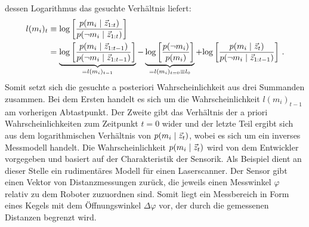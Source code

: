 dessen Logarithmus das gesuchte Verhältnis liefert:
\begin{equation}
\begin{split}
l(m_i)_t &\equiv \text{log}\left[ { \frac{p({m_i} \hspace{1mm} \vert \hspace{1mm} {\vec{z}_{1:t}})}{p({\neg m_i} \hspace{1mm} \vert \hspace{1mm} {\vec{z}_{1:t}})} } \right]  \\
&= \underbrace{\text{log}\left[ { \frac{p({m_i} \hspace{1mm} \vert \hspace{1mm} {\vec{z}_{1:t-1}})}{p({\neg m_i} \hspace{1mm} \vert \hspace{1mm} {\vec{z}_{1:t-1}})} } \right]}_{= l(m_i)_{t-1}} 
- \underbrace{ \text{log}\left[ { \frac{p(\neg m_i)}{p(m_i)} } \right] }_{=l(m_i)_{t=0}\equiv l_0}
 + \text{log}\left[ { \frac{p({m_i} \hspace{1mm} \vert \hspace{1mm} {\vec{z}_t})}{p({\neg m_i} \hspace{1mm} \vert \hspace{1mm} {\vec{z}_{1:t-1}})} } \right]\,.
\end{split}
\end{equation}
Somit setzt sich die gesuchte a posteriori Wahrscheinlichkeit aus drei Summanden zusammen. Bei dem Ersten handelt es sich um die Wahrscheinlichkeit $l(m_i)_{t-1}$ am vorherigen Abtastpunkt. Der Zweite gibt das Verhältnis der a priori Wahrscheinlichkeiten zum Zeitpunkt $t=0$ wider und der letzte Teil ergibt sich aus dem logarithmischen Verhältnis von $p({m_i} \hspace{1mm} \vert \hspace{1mm} {\vec{z}_t})$, wobei es sich um ein inverses Messmodell handelt. Die Wahrscheinlichkeit $p({m_i} \hspace{1mm} \vert \hspace{1mm} {\vec{z}_t})$ wird von dem Entwickler vorgegeben und basiert auf der Charakteristik der Sensorik.
Als Beispiel dient an dieser Stelle ein rudimentäres Modell für einen Laserscanner. Der Sensor gibt einen Vektor von Distanzmessungen zurück, die jeweils einen Messwinkel $\varphi$ relativ zu dem Roboter zuzuordnen sind. Somit liegt ein Messbereich in Form eines Kegels mit dem Öffnungswinkel $\Delta \varphi$ vor, der durch die gemessenen Distanzen begrenzt wird.

